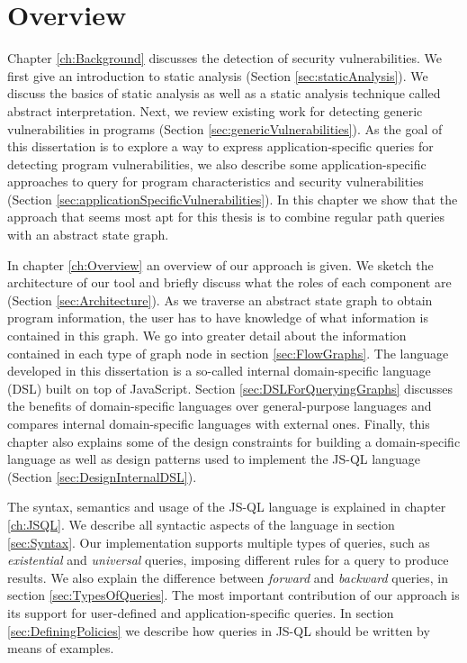\section{Overview}

Chapter \ref{ch:Background} discusses the detection of security vulnerabilities. We first give an introduction to static analysis (Section \ref{sec:staticAnalysis}). We discuss the basics of static analysis as well as a static analysis technique called abstract interpretation. Next, we review existing work for detecting generic vulnerabilities in programs (Section \ref{sec:genericVulnerabilities}). As the goal of this dissertation is to explore a way to express application-specific queries for detecting program vulnerabilities, we also describe some application-specific approaches to query for program characteristics and security vulnerabilities (Section \ref{sec:applicationSpecificVulnerabilities}). In this chapter we show that the approach that seems most apt for this thesis is to combine regular path queries with an abstract state graph.

In chapter \ref{ch:Overview} an overview of our approach is given. We sketch the architecture of our tool and briefly discuss what the roles of each component are (Section \ref{sec:Architecture}). As we traverse an abstract state graph to obtain program information, the user has to have knowledge of what information is contained in this graph. We go into greater detail about the information contained in each type of graph node in section \ref{sec:FlowGraphs}. The language developed in this dissertation is a so-called internal domain-specific language (DSL) built on top of JavaScript. Section  \ref{sec:DSLForQueryingGraphs} discusses the benefits of domain-specific languages over general-purpose languages and compares internal domain-specific languages with external ones. Finally, this chapter also explains some of the design constraints for building a domain-specific language as well as design patterns used to implement the JS-QL language (Section \ref{sec:DesignInternalDSL}).

The syntax, semantics and usage of the JS-QL language is explained in chapter \ref{ch:JSQL}. We describe all syntactic aspects of the language in section \ref{sec:Syntax}. Our implementation supports multiple types of queries, such as \textit{existential} and \textit{universal} queries, imposing different rules for a query to produce results. We also explain the difference between \textit{forward} and \textit{backward} queries, in section \ref{sec:TypesOfQueries}. The most important contribution of our approach is its support for user-defined and application-specific queries. In section \ref{sec:DefiningPolicies} we describe how queries in JS-QL should be written by means of examples.

